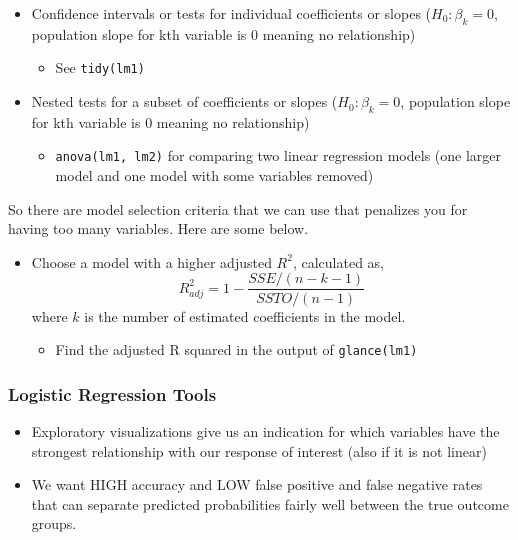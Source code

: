 \documentclass[
]{book}
\providecommand{\tightlist}{%
  \setlength{\itemsep}{0pt}\setlength{\parskip}{0pt}}
\begin{document}
\begin{itemize}
\tightlist
\item
  Confidence intervals or tests for individual coefficients or slopes (\(H_0: \beta_k = 0\), population slope for kth variable is 0 meaning no relationship)

  \begin{itemize}
  \tightlist
  \item
    See \texttt{tidy(lm1)}
  \end{itemize}
\item
  Nested tests for a subset of coefficients or slopes (\(H_0: \beta_k = 0\), population slope for kth variable is 0 meaning no relationship)

  \begin{itemize}
  \tightlist
  \item
    \texttt{anova(lm1,\ lm2)} for comparing two linear regression models (one larger model and one model with some variables removed)
  \end{itemize}
\end{itemize}

So there are model selection criteria that we can use that penalizes you for having too many variables. Here are some below.

\begin{itemize}
\tightlist
\item
  Choose a model with a higher adjusted \(R^2\), calculated as,
  \[R^2_{adj} = 1 - \frac{SSE/(n-k-1)}{SSTO/(n-1)}\]
  where \(k\) is the number of estimated coefficients in the model.

  \begin{itemize}
  \tightlist
  \item
    Find the adjusted R squared in the output of \texttt{glance(lm1)}
  \end{itemize}
\end{itemize}

\hypertarget{logistic-regression-tools}{%
\subsubsection{Logistic Regression Tools}\label{logistic-regression-tools}}

\begin{itemize}
\tightlist
\item
  Exploratory visualizations give us an indication for which variables have the strongest relationship with our response of interest (also if it is not linear)\\
\item
  We want HIGH accuracy and LOW false positive and false negative rates that can separate predicted probabilities fairly well between the true outcome groups.
\end{itemize}
\end{document}

